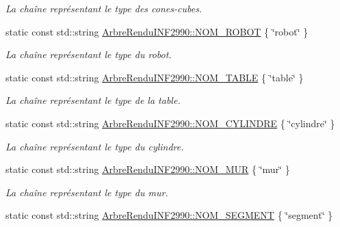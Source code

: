\begin{DoxyCompactItemize}
\begin{DoxyCompactList}\small\item\em La chaîne représentant le type des cones-\/cubes. \end{DoxyCompactList}\item 
\hypertarget{group__inf2990_ga9a6799aa8903b858929bf675e4468aac}{}static const std\+::string \hyperlink{group__inf2990_ga9a6799aa8903b858929bf675e4468aac}{Arbre\+Rendu\+I\+N\+F2990\+::\+N\+O\+M\+\_\+\+R\+O\+B\+O\+T} \{ \char`\"{}robot\char`\"{} \}\label{group__inf2990_ga9a6799aa8903b858929bf675e4468aac}

\begin{DoxyCompactList}\small\item\em La chaîne représentant le type du robot. \end{DoxyCompactList}\item 
\hypertarget{group__inf2990_ga89e651c1a28481ce70f473bd15555114}{}static const std\+::string \hyperlink{group__inf2990_ga89e651c1a28481ce70f473bd15555114}{Arbre\+Rendu\+I\+N\+F2990\+::\+N\+O\+M\+\_\+\+T\+A\+B\+L\+E} \{ \char`\"{}table\char`\"{} \}\label{group__inf2990_ga89e651c1a28481ce70f473bd15555114}

\begin{DoxyCompactList}\small\item\em La chaîne représentant le type de la table. \end{DoxyCompactList}\item 
\hypertarget{group__inf2990_gae74e1de66e37dee6ef6cb6df82424c0d}{}static const std\+::string \hyperlink{group__inf2990_gae74e1de66e37dee6ef6cb6df82424c0d}{Arbre\+Rendu\+I\+N\+F2990\+::\+N\+O\+M\+\_\+\+C\+Y\+L\+I\+N\+D\+R\+E} \{ \char`\"{}cylindre\char`\"{} \}\label{group__inf2990_gae74e1de66e37dee6ef6cb6df82424c0d}

\begin{DoxyCompactList}\small\item\em La chaîne représentant le type du cylindre. \end{DoxyCompactList}\item 
\hypertarget{group__inf2990_ga4d9c8c9bfa165dde522834dec2882039}{}static const std\+::string \hyperlink{group__inf2990_ga4d9c8c9bfa165dde522834dec2882039}{Arbre\+Rendu\+I\+N\+F2990\+::\+N\+O\+M\+\_\+\+M\+U\+R} \{ \char`\"{}mur\char`\"{} \}\label{group__inf2990_ga4d9c8c9bfa165dde522834dec2882039}

\begin{DoxyCompactList}\small\item\em La chaîne représentant le type du mur. \end{DoxyCompactList}\item 
\hypertarget{group__inf2990_gaffe953e9369343040aa5d1b72510d810}{}static const std\+::string \hyperlink{group__inf2990_gaffe953e9369343040aa5d1b72510d810}{Arbre\+Rendu\+I\+N\+F2990\+::\+N\+O\+M\+\_\+\+S\+E\+G\+M\+E\+N\+T} \{ \char`\"{}segment\char`\"{} \}\label{group__inf2990_gaffe953e9369343040aa5d1b72510d810}


\end{DoxyCompactItemize}
